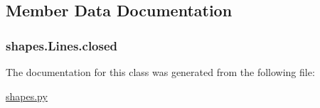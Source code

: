 \subsection{Member Data Documentation}
\hypertarget{classshapes_1_1_lines_a87e81650a1ec34c0e8a32cf7c31d81a3}{}
\subsubsection[{closed}]{\setlength{\rightskip}{0pt plus 5cm}shapes.\+Lines.\+closed}\label{classshapes_1_1_lines_a87e81650a1ec34c0e8a32cf7c31d81a3}


The documentation for this class was generated from the following file\+:\begin{DoxyCompactItemize}
\item 
\hyperlink{shapes_8py}{shapes.\+py}\end{DoxyCompactItemize}
